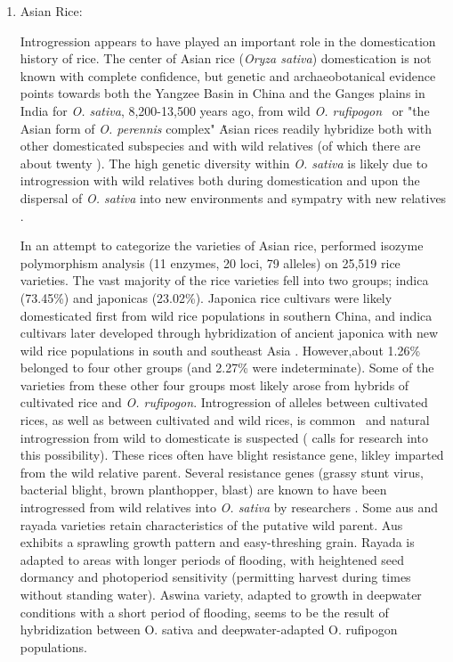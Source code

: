 \documentclass[11pt]{article}
\begin{document}
\begin{enumerate}
\begin{enumerate}
\item{Asian Rice:}




Introgression appears to have played an important role in the domestication history of rice.
The center of Asian rice (\emph{Oryza sativa}) domestication is not known with complete confidence, but genetic and archaeobotanical evidence points towards both the Yangzee Basin in China and the Ganges plains in India for \emph{O. sativa}, 8,200-13,500 years ago, from wild \emph{O. rufipogon}  \cite{oka2012origin, fuller2010consilience, ricepedia, molina2011molecular}\ or "the Asian form of \emph{O. perennis} complex" \cite{oka2012origin}\.
Asian rices readily hybridize both with other domesticated subspecies and with wild relatives (of which there are about twenty \cite{ricepedia}).
The high genetic diversity within \emph{O. sativa} is likely due to introgression with wild relatives both during domestication and upon the dispersal of \emph{O. sativa} into new environments and sympatry with new relatives \cite{second1982origin}.

In an attempt to categorize the varieties of Asian rice, \cite{khush2003classifying} performed isozyme polymorphism analysis (11 enzymes, 20 loci, 79 alleles) on 25,519 rice varieties.
The vast majority of the rice varieties fell into two groups; indica (73.45\%) and japonicas (23.02\%).
Japonica rice cultivars were likely domesticated first from wild rice populations in southern China, and indica cultivars later developed through hybridization of ancient japonica with new wild rice populations in south and southeast Asia \cite{Huang2012, londo2006phylogeography}.
However,about 1.26\% belonged to four other groups (and 2.27\% were indeterminate).
Some of the varieties from these other four groups most likely arose from hybrids of cultivated rice and \emph{O. rufipogon}.
Introgression of alleles between cultivated rices, as well as between cultivated and wild rices, is common \cite{oka2012origin, second1982origin, zhao2010genomic}\, and natural introgression from wild to domesticate is suspected (\cite{zhao2010genomic} calls for research into this possibility).
These rices often have blight resistance gene, likley imparted from the wild relative parent.
Several resistance genes (grassy stunt virus, bacterial blight, brown planthopper, blast) are known to have been introgressed from wild relatives into \emph{O. sativa} by researchers \cite{brar1997alien, khush1974inheritance}.
Some aus and rayada varieties retain characteristics of the putative wild parent.
Aus exhibits a sprawling growth pattern and easy-threshing grain.
Rayada is adapted to areas with longer periods of flooding, with heightened seed dormancy and photoperiod sensitivity (permitting harvest during times without standing water).
Aswina variety, adapted to growth in deepwater conditions with a short period of flooding, seems to be the result of hybridization between O. sativa and deepwater-adapted O. rufipogon populations.


\end{enumerate}
\end{enumerate}
\end{document}
